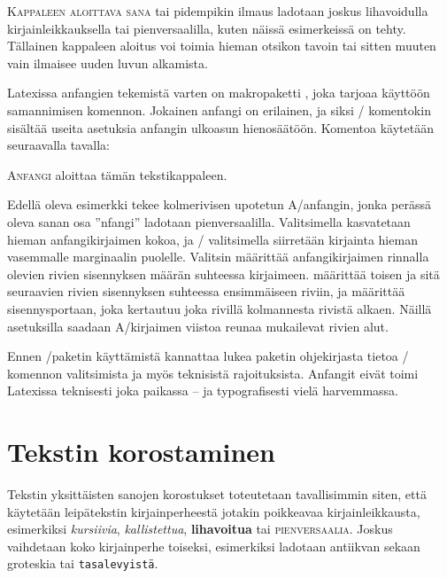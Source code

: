 \lettrine[lines=1, loversize=.1, lhang=.02, findent=1.5bp]{K}{appaleen
  aloittava sana} tai pidempikin ilmaus ladotaan joskus lihavoidulla
kirjainleikkauksella tai pienversaalilla, kuten näissä esimerkeissä on
tehty. Tällainen kappaleen aloitus voi toimia hieman otsikon tavoin tai
sitten muuten vain ilmaisee uuden luvun alkamista.

Latexissa anfangien tekemistä varten on makropaketti
, joka tarjoaa käyttöön samannimisen
komennon. Jokainen anfangi on erilainen, ja siksi \-/
komentokin sisältää useita asetuksia anfangin ulkoasun hienosäätöön.
Komentoa käytetään seuraavalla tavalla:

\begin{koodilohkosis}
  \lettrine[lines=3, loversize=.06, lhang=.02, findent=-5bp,
  nindent=4bp, slope=4bp]{A}{nfangi} aloittaa tämän tekstikappaleen.
\end{koodilohkosis}

Edellä oleva esimerkki tekee kolmerivisen upotetun A\-/anfangin, jonka
perässä oleva sanan osa ''nfangi'' ladotaan pienversaalilla.
Valitsimella  kasvatetaan hieman anfangikirjaimen
kokoa, ja \-/ valitsimella siirretään kirjainta hieman
vasemmalle marginaalin puolelle. Valitsin  määrittää
anfangikirjaimen rinnalla olevien rivien sisennyksen määrän suhteessa
kirjaimeen.  määrittää toisen ja sitä seuraavien rivien
sisennyksen suhteessa ensimmäiseen riviin, ja  määrittää
sisennysportaan, joka kertautuu joka rivillä kolmannesta rivistä alkaen.
Näillä asetuksilla saadaan A\-/kirjaimen viistoa reunaa mukailevat
rivien alut.

Ennen \-/paketin käyttämistä kannattaa lukea paketin
ohjekirjasta tietoa \-/ komennon valitsimista ja myös
teknisistä rajoituksista. Anfangit eivät toimi Latexissa teknisesti joka
paikassa -- ja typografisesti vielä harvemmassa.

\section{Tekstin korostaminen}
\label{luku:korostus}

Tekstin yksittäisten sanojen korostukset toteutetaan tavallisimmin
siten, että käytetään leipätekstin kirjainperheestä jotakin poikkeavaa
kirjainleikkausta, esimerkiksi \textit{kursiivia},
\textsl{kallistettua}, \textbf{lihavoitua} tai \textsc{pienversaalia}.
Joskus vaihdetaan koko kirjainperhe toiseksi, esimerkiksi ladotaan
\textrm{antiikvan} sekaan \textsf{groteskia} tai \texttt{tasalevyistä}.

